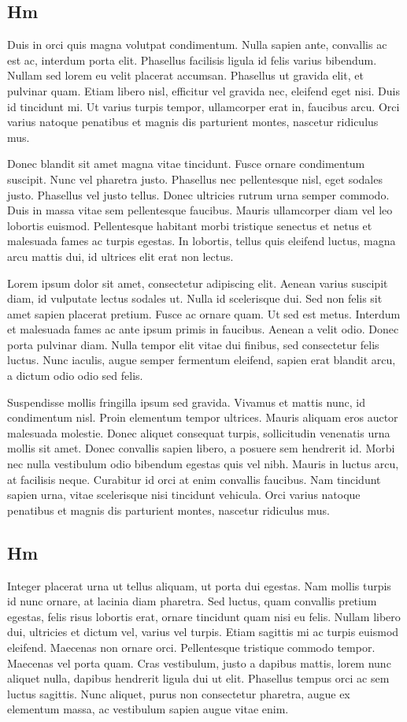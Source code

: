 \documentclass{article}
\begin{document}
\subsection{Hm}
Duis in orci quis magna volutpat condimentum. Nulla sapien ante, convallis ac est ac, interdum porta elit. Phasellus facilisis ligula id felis varius bibendum. Nullam sed lorem eu velit placerat accumsan. Phasellus ut gravida elit, et pulvinar quam. Etiam libero nisl, efficitur vel gravida nec, eleifend eget nisi. Duis id tincidunt mi. Ut varius turpis tempor, ullamcorper erat in, faucibus arcu. Orci varius natoque penatibus et magnis dis parturient montes, nascetur ridiculus mus.

Donec blandit sit amet magna vitae tincidunt. Fusce ornare condimentum suscipit. Nunc vel pharetra justo. Phasellus nec pellentesque nisl, eget sodales justo. Phasellus vel justo tellus. Donec ultricies rutrum urna semper commodo. Duis in massa vitae sem pellentesque faucibus. Mauris ullamcorper diam vel leo lobortis euismod. Pellentesque habitant morbi tristique senectus et netus et malesuada fames ac turpis egestas. In lobortis, tellus quis eleifend luctus, magna arcu mattis dui, id ultrices elit erat non lectus. 


Lorem ipsum dolor sit amet, consectetur adipiscing elit. Aenean varius suscipit diam, id vulputate lectus sodales ut. Nulla id scelerisque dui. Sed non felis sit amet sapien placerat pretium. Fusce ac ornare quam. Ut sed est metus. Interdum et malesuada fames ac ante ipsum primis in faucibus. Aenean a velit odio. Donec porta pulvinar diam. Nulla tempor elit vitae dui finibus, sed consectetur felis luctus. Nunc iaculis, augue semper fermentum eleifend, sapien erat blandit arcu, a dictum odio odio sed felis.

Suspendisse mollis fringilla ipsum sed gravida. Vivamus et mattis nunc, id condimentum nisl. Proin elementum tempor ultrices. Mauris aliquam eros auctor malesuada molestie. Donec aliquet consequat turpis, sollicitudin venenatis urna mollis sit amet. Donec convallis sapien libero, a posuere sem hendrerit id. Morbi nec nulla vestibulum odio bibendum egestas quis vel nibh. Mauris in luctus arcu, at facilisis neque. Curabitur id orci at enim convallis faucibus. Nam tincidunt sapien urna, vitae scelerisque nisi tincidunt vehicula. Orci varius natoque penatibus et magnis dis parturient montes, nascetur ridiculus mus.
\subsection{Hm}
Integer placerat urna ut tellus aliquam, ut porta dui egestas. Nam mollis turpis id nunc ornare, at lacinia diam pharetra. Sed luctus, quam convallis pretium egestas, felis risus lobortis erat, ornare tincidunt quam nisi eu felis. Nullam libero dui, ultricies et dictum vel, varius vel turpis. Etiam sagittis mi ac turpis euismod eleifend. Maecenas non ornare orci. Pellentesque tristique commodo tempor. Maecenas vel porta quam. Cras vestibulum, justo a dapibus mattis, lorem nunc aliquet nulla, dapibus hendrerit ligula dui ut elit. Phasellus tempus orci ac sem luctus sagittis. Nunc aliquet, purus non consectetur pharetra, augue ex elementum massa, ac vestibulum sapien augue vitae enim.
\end{document}
